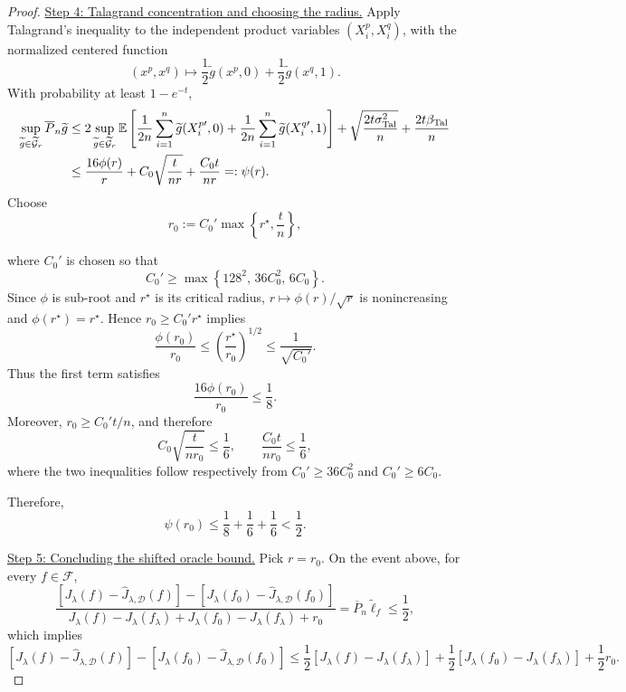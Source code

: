 \documentclass[11pt]{article}
\theoremstyle{plain}
\theoremstyle{definition}
\theoremstyle{remark}
\newcommand{\proofstep}[1]{\par\medskip\noindent\uline{#1}}
\begin{document}
\begin{proof}
\proofstep{Step 4: Talagrand concentration and choosing the radius.}
Apply Talagrand's inequality to the independent product variables
\((X_i^p,X_i^q)\), with the normalized centered function
\[
(x^p,x^q)
\mapsto
\frac12\widetilde g(x^p,0)+\frac12\widetilde g(x^q,1).
\]
With probability at least \(1-e^{-t}\),
\[
\begin{aligned}
\sup_{\widetilde g\in\widetilde{\mathcal G}_r}
\overline P_n\widetilde g
&\le
2
\sup_{\widetilde g\in\widetilde{\mathcal G}_r}
\mathbb E
\left[
\frac1{2n}\sum_{i=1}^{n}\widetilde g(X_i^{p\prime},0)
+
\frac1{2n}\sum_{i=1}^{n}\widetilde g(X_i^{q\prime},1)
\right]
+
\sqrt{\frac{2t\sigma_{\rm Tal}^2}{n}}
+
\frac{2t\beta_{\rm Tal}}{n}\\
&\le
\frac{16\phi(r)}{r}
+
C_0\sqrt{\frac{t}{nr}}
+
\frac{C_0t}{nr}
=:\psi(r).
\end{aligned}
\]
Choose
\[
r_0:=
C_0'
\max\left\{
r^\star,\frac{t}{n}
\right\},
\]

where \(C_0'\) is chosen so that
\[
C_0'
\ge
\max\left\{128^2,\,36C_0^2,\,6C_0\right\}.
\]
Since \(\phi\) is sub-root and
\(r^\star\) is its critical radius, \(r\mapsto \phi(r)/\sqrt r\) is nonincreasing and
\(\phi(r^\star)=r^\star\). Hence \(r_0\ge C_0'r^\star\) implies
\[
\frac{\phi(r_0)}{r_0}
\le
\left(\frac{r^\star}{r_0}\right)^{1/2}
\le
\frac{1}{\sqrt{C_0'}}.
\]
Thus the first term satisfies
\[
\frac{16\phi(r_0)}{r_0}\le\frac18.
\]
Moreover, \(r_0\ge C_0't/n\), and therefore
\[
{C_0}\sqrt{\frac{t}{nr_0}}\le\frac16,
\qquad
\frac{{C_0}t}{nr_0}\le\frac16,
\]
where the two inequalities follow respectively from
\(C_0'\ge36C_0^2\) and
\(C_0'\ge6C_0\).

Therefore,
\[
\psi(r_0)
\le
\frac18+\frac16+\frac16
<
\frac12.
\]

\proofstep{Step 5: Concluding the shifted oracle bound.}
Pick \(r=r_0\). On the event above, for every \(f\in\mathcal F\),
\[
\frac{
\left[
J_\lambda(f)-\widehat J_{\lambda,\mathcal D}(f)
\right]
-
\left[
J_\lambda(f_0)-\widehat J_{\lambda,\mathcal D}(f_0)
\right]
}{
J_\lambda(f)-J_\lambda(f_\lambda)
+
J_\lambda(f_0)-J_\lambda(f_\lambda)+r_0
}
=
\overline P_n\widetilde{\ell}_f
\le
\frac12,
\]
which implies
\[
\left[
J_\lambda(f)-\widehat J_{\lambda,\mathcal D}(f)
\right]
-
\left[
J_\lambda(f_0)-\widehat J_{\lambda,\mathcal D}(f_0)
\right]
\le
\frac12\left[J_\lambda(f)-J_\lambda(f_\lambda)\right]
+
\frac12\left[J_\lambda(f_0)-J_\lambda(f_\lambda)\right]
+
\frac12r_0.
\]


\end{proof}
\end{document}
